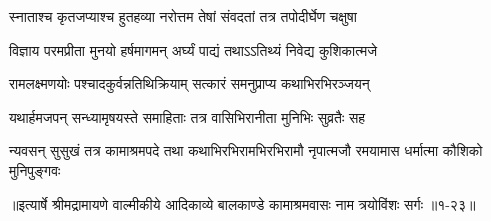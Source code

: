 \twolineshloka
{स्नाताश्च कृतजप्याश्च हुतहव्या नरोत्तम}
{तेषां संवदतां तत्र तपोदीर्घेण चक्षुषा} %

\twolineshloka
{विज्ञाय परमप्रीता मुनयो हर्षमागमन्}
{अर्घ्यं पाद्यं तथाऽऽतिथ्यं निवेद्य कुशिकात्मजे} %

\twolineshloka
{रामलक्ष्मणयोः पश्चादकुर्वन्नतिथिक्रियाम्}
{सत्कारं समनुप्राप्य कथाभिरभिरञ्जयन्} %

\twolineshloka
{यथार्हमजपन् सन्ध्यामृषयस्ते समाहिताः}
{तत्र वासिभिरानीता मुनिभिः सुव्रतैः सह} %

\threelineshloka
{न्यवसन् सुसुखं तत्र कामाश्रमपदे तथा}
{कथाभिरभिरामभिरभिरामौ नृपात्मजौ}
{रमयामास धर्मात्मा कौशिको मुनिपुङ्गवः} %


॥इत्यार्षे श्रीमद्रामायणे वाल्मीकीये आदिकाव्ये बालकाण्डे कामाश्रमवासः नाम त्रयोविंशः सर्गः ॥१-२३॥
